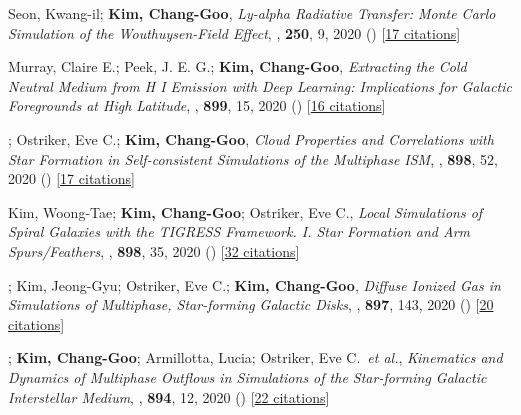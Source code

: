 \item[{24.}]Seon, Kwang-il; \textbf{Kim, Chang-Goo}, \textit{Ly-alpha Radiative Transfer: Monte Carlo Simulation of the Wouthuysen-Field Effect}, , \textbf{250}, 9, 2020 () [\href{http://adsabs.harvard.edu/abs/2020ApJS..250....9S}{17 citations}]

\item[{23.}]Murray, Claire E.; Peek, J. E. G.; \textbf{Kim, Chang-Goo}, \textit{Extracting the Cold Neutral Medium from H I Emission with Deep Learning: Implications for Galactic Foregrounds at High Latitude}, , \textbf{899}, 15, 2020 () [\href{http://adsabs.harvard.edu/abs/2020ApJ...899...15M}{16 citations}]

\item[{22.}]; Ostriker, Eve C.; \textbf{Kim, Chang-Goo}, \textit{Cloud Properties and Correlations with Star Formation in Self-consistent Simulations of the Multiphase ISM}, , \textbf{898}, 52, 2020 () [\href{http://adsabs.harvard.edu/abs/2020ApJ...898...52M}{17 citations}]

\item[{21.}]Kim, Woong-Tae; \textbf{Kim, Chang-Goo}; Ostriker, Eve C., \textit{Local Simulations of Spiral Galaxies with the TIGRESS Framework. I. Star Formation and Arm Spurs/Feathers}, , \textbf{898}, 35, 2020 () [\href{http://adsabs.harvard.edu/abs/2020ApJ...898...35K}{32 citations}]

\item[{20.}]; Kim, Jeong-Gyu; Ostriker, Eve C.; \textbf{Kim, Chang-Goo}, \textit{Diffuse Ionized Gas in Simulations of Multiphase, Star-forming Galactic Disks}, , \textbf{897}, 143, 2020 () [\href{http://adsabs.harvard.edu/abs/2020ApJ...897..143K}{20 citations}]

\item[{19.}]; \textbf{Kim, Chang-Goo}; Armillotta, Lucia; Ostriker, Eve C.~\textit{et al.}, \textit{Kinematics and Dynamics of Multiphase Outflows in Simulations of the Star-forming Galactic Interstellar Medium}, , \textbf{894}, 12, 2020 () [\href{http://adsabs.harvard.edu/abs/2020ApJ...894...12V}{22 citations}]

